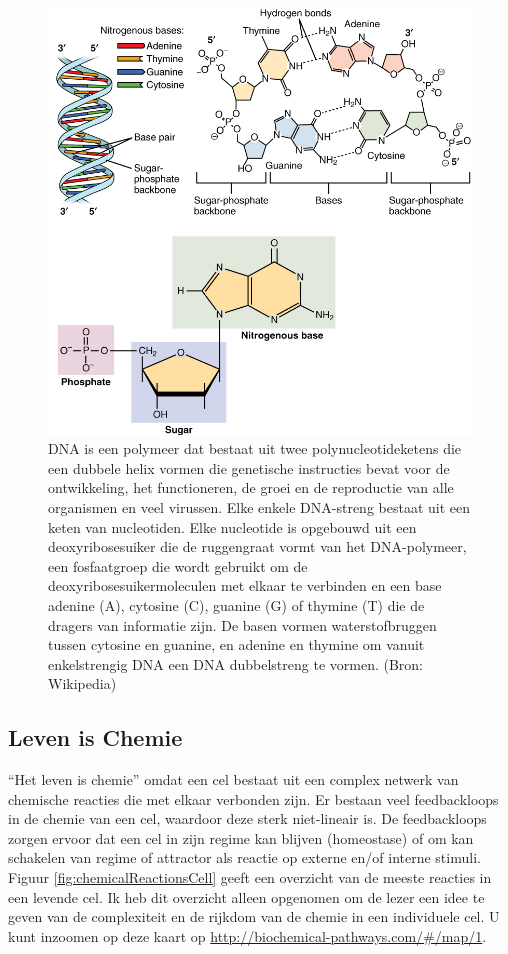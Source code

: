 \documentclass[
  11pt,
]{book}
\begin{document}
\begin{figure}

{\centering \includegraphics[width=0.5\linewidth]{./figs/DNA_Nucleotides} 

}

\caption{DNA is een polymeer dat bestaat uit twee polynucleotideketens die een dubbele helix vormen die genetische instructies bevat voor de ontwikkeling, het functioneren, de groei en de reproductie van alle organismen en veel virussen. Elke enkele DNA-streng bestaat uit een keten van nucleotiden. Elke nucleotide is opgebouwd uit een deoxyribosesuiker die de ruggengraat vormt van het DNA-polymeer, een fosfaatgroep die wordt gebruikt om de deoxyribosesuikermoleculen met elkaar te verbinden en een base adenine (A), cytosine (C), guanine (G) of thymine (T) die de dragers van informatie zijn. De basen vormen waterstofbruggen tussen cytosine en guanine, en adenine en thymine om vanuit enkelstrengig DNA een DNA dubbelstreng te vormen. (Bron: Wikipedia)}\label{fig:DNA}
\end{figure}

\newpage

\hypertarget{lifeChemistry}{%
\subsection{Leven is Chemie}\label{lifeChemistry}}

``Het leven is chemie'' omdat een cel bestaat uit een complex netwerk van chemische reacties die met elkaar verbonden zijn. Er bestaan veel feedbackloops in de chemie van een cel, waardoor deze sterk niet-lineair is. De feedbackloops zorgen ervoor dat een cel in zijn regime kan blijven (homeostase) of om kan schakelen van regime of attractor als reactie op externe en/of interne stimuli. Figuur \ref{fig:chemicalReactionsCell} geeft een overzicht van de meeste reacties in een levende cel. Ik heb dit overzicht alleen opgenomen om de lezer een idee te geven van de complexiteit en de rijkdom van de chemie in een individuele cel. U kunt inzoomen op deze kaart op \url{http://biochemical-pathways.com/\#/map/1}.
\end{document}
